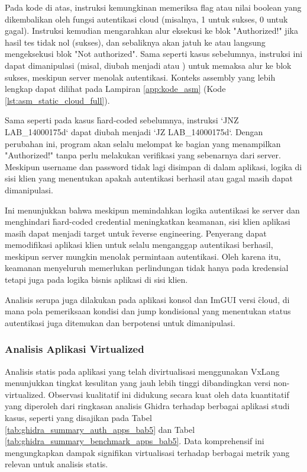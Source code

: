 Pada kode di atas, instruksi  kemungkinan memeriksa flag atau nilai boolean yang dikembalikan oleh fungsi autentikasi cloud (misalnya, 1 untuk sukses, 0 untuk gagal). Instruksi  kemudian mengarahkan alur eksekusi ke blok "Authorized!" jika hasil tes tidak nol (sukses), dan sebaliknya akan jatuh ke  atau langsung mengeksekusi blok "Not authorized". Sama seperti kasus sebelumnya, instruksi  ini dapat dimanipulasi (misal, diubah menjadi  atau ) untuk memaksa alur ke blok sukses, meskipun server menolak autentikasi. Konteks assembly yang lebih lengkap dapat dilihat pada Lampiran \ref{app:kode_asm} (Kode \ref{lst:asm_static_cloud_full}).

Sama seperti pada kasus \f{hard-coded} sebelumnya, instruksi `JNZ LAB\_14000175d` dapat diubah menjadi `JZ LAB\_14000175d`. Dengan perubahan ini, program akan selalu melompat ke bagian yang menampilkan "Authorized!" tanpa perlu melakukan verifikasi yang sebenarnya dari server. Meskipun username dan password tidak lagi disimpan di dalam aplikasi, logika di sisi klien yang menentukan apakah autentikasi berhasil atau gagal masih dapat dimanipulasi.

Ini menunjukkan bahwa meskipun memindahkan logika autentikasi ke server dan menghindari \f{hard-coded credential} meningkatkan keamanan, sisi klien aplikasi masih dapat menjadi target untuk \f{reverse engineering}. Penyerang dapat memodifikasi aplikasi klien untuk selalu menganggap autentikasi berhasil, meskipun server mungkin menolak permintaan autentikasi. Oleh karena itu, keamanan menyeluruh memerlukan perlindungan tidak hanya pada kredensial tetapi juga pada logika bisnis aplikasi di sisi klien.

Analisis serupa juga dilakukan pada aplikasi konsol dan ImGUI versi \f{cloud}, di mana pola pemeriksaan kondisi dan jump kondisional yang menentukan status autentikasi juga ditemukan dan berpotensi untuk dimanipulasi.

\subsubsection{Analisis Aplikasi Virtualized}

Analisis statis pada aplikasi yang telah divirtualisasi menggunakan VxLang menunjukkan tingkat kesulitan yang jauh lebih tinggi dibandingkan versi non-virtualized. Observasi kualitatif ini didukung secara kuat oleh data kuantitatif yang diperoleh dari ringkasan analisis Ghidra terhadap berbagai aplikasi studi kasus, seperti yang disajikan pada Tabel \ref{tab:ghidra_summary_auth_apps_bab5} dan Tabel \ref{tab:ghidra_summary_benchmark_apps_bab5}. Data komprehensif ini mengungkapkan dampak signifikan virtualisasi terhadap berbagai metrik yang relevan untuk analisis statis.

